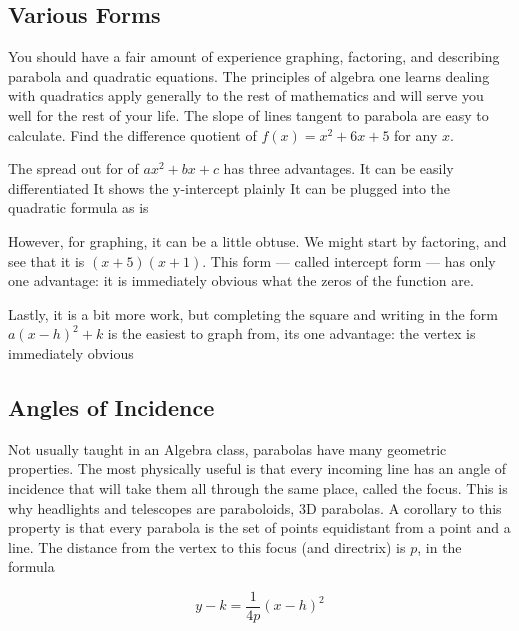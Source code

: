 
\subsection{Various Forms}



You should have a fair amount of experience graphing, factoring, and describing
parabola and quadratic equations.  The principles of algebra one learns dealing with quadratics
apply generally to the rest of mathematics and will serve you well for the rest of your life.
The slope of lines tangent to parabola are easy to calculate.
Find the difference quotient of $f(x)=x^2+6x+5$ for any $x$.


The spread out for of $ax^2+bx+c$ has three advantages.  
It can be easily differentiated
It shows the y-intercept plainly
It can be plugged into the quadratic formula as is

However, for graphing, it can be a little obtuse.  We might start by factoring, and see that it is
$(x+5)(x+1)$.  This form --- called intercept form --- 
has only one advantage: it is immediately obvious what the zeros of the function are.

Lastly, it is a bit more work, but completing the square and writing in the form $a(x-h)^2+k$
is the easiest to graph from, its one advantage:
the vertex is immediately obvious

\subsection{Angles of Incidence}
Not usually taught in an Algebra class, parabolas have many geometric properties.  The most
physically useful is that every incoming line has an angle of incidence that will take them all
through the same place, called the focus.  This is why headlights and telescopes are paraboloids,
3D parabolas.  A corollary to this property is that every parabola is the set of points equidistant 
from a point and a line.  The distance from the vertex to this focus (and directrix) is $p$, in the
formula

$$
y-k = \frac{1}{4p}(x-h)^2
$$

~\vfill